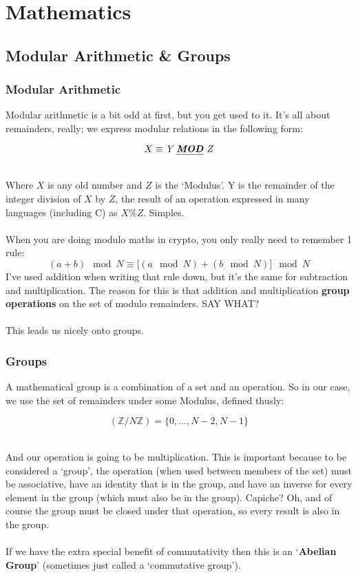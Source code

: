 
\chapter{Mathematics}
    \section{Modular Arithmetic \& Groups}
    \subsection{Modular Arithmetic}
    Modular arithmetic is a bit odd at first, but you get used to it. It's all about remainders, really; we express modular relations in the following form:\\
    \begin{figure}[htp!]
    \centering
        $$ X \equiv \textit{Y \emph{\textbf{MOD}} Z} $$
    \end{figure}\\
    Where $X$ is any old number and $Z$ is the `Modulus'. Y is the remainder of the integer division of $X$ by $Z$, the result of an operation expressed in many languages (including C) as $X \% Z$. Simples.\\
    \\
    When you are doing modulo maths in crypto, you only really need to remember 1 rule:
    $$(a+b) \mod N \equiv \big[(a \mod N) + (b \mod N)\big] \mod N$$
    I've used addition when writing that rule down, but it's the same for subtraction and multiplication. The reason for this is that addition and multiplication \textbf{group operations} on the set of modulo remainders. SAY WHAT?\\
    \\
    This leads us nicely onto groups.

    \subsection{Groups}
    A mathematical group is a combination of a set and an operation. So in our case, we use the set of remainders under some Modulus, defined thusly:
    \begin{figure}[htp!]
    $$
        (\mathbb{Z}/N\mathbb{Z}) = \{0,..., N - 2, N - 1 \}
    $$
    \end{figure}\\
    And our operation is going to be multiplication. This is important because to be considered a `group', the operation (when used between members of the set) must be associative, have an identity that is in the group, and have an inverse for every element in the group (which must also be in the group). Capiche? Oh, and of course the group must be closed under that operation, so every result is also in the group.\\
    \\
    If we have the extra special benefit of commutativity then this is an `\textbf{Abelian Group}' (sometimes just called a `commutative group').

